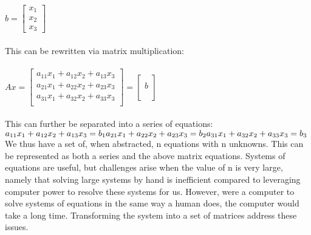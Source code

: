 \documentclass{article}
\begin{document}
\begin{math}b=\begin{bmatrix}x_{1}\\x_{2}\\x_{3}\end{bmatrix}\end{math}\\\\
This can be rewritten via matrix multiplication:\\\\
\begin{math}Ax=\begin{bmatrix}a_{11}x_1 + a_{12}x_2 + a_{13}x_3\\a_{21}x_1 + a_{22}x_2 + a_{23}x_3\\a_{31}x_1 + a_{32}x_2 + a_{33}x_3\\\end{bmatrix} = \begin{bmatrix}\\b\\\\\end{bmatrix}\end{math}\\\\
This can further be separated into a series of equations:\\
\begin{math}
a_{11}x_1 + a_{12}x_2 + a_{13}x_3=b_1\\
a_{21}x_1 + a_{22}x_2 + a_{23}x_3=b_2\\
a_{31}x_1 + a_{32}x_2 + a_{33}x_3=b_3
\end{math}\\
We thus have a set of, when abstracted, n equations with n unknowns. This can be represented as both a series and the above matrix equations. Systems of equations are useful, but challenges arise when the value of n is very large, namely that solving large systems by hand is inefficient compared to leveraging computer power to resolve these systems for us. However, were a computer to solve systems of equations in the same way a human does, the computer would take a long time. Transforming the system into a set of matrices address these issues.\\
\end{document}
